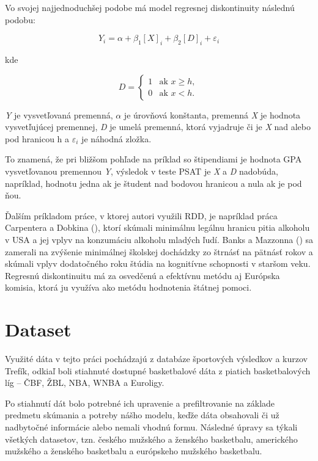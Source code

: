 \documentclass[
  digital, %
  oneside, %
  notable,   %
  lof,     %
  lot,     %
]{fithesis3}
\begin{document}
		Vo svojej najjednoduchšej podobe má model regresnej diskontinuity následnú podobu:
		
		\begin{equation}
		Y_{i} = \alpha + \beta _{1} [\textit{X}]_{i} + \beta _{2} [\textit{D}]_{i} + \varepsilon_{i}
		\end{equation}
		
		kde 
		
		 \begin{equation}
		D = \begin{cases}
		1 & \text{ak }x\geq{h}, \\
		0 & \text{ak }x < {h}.
		\end{cases}
		\end{equation}
		
		\textit{Y} je vysvetľovaná premenná, $\alpha$ je úrovňová konštanta, premenná \textit{X} je hodnota vysvetľujúcej premennej, \textit{D} je umelá premenná, ktorá vyjadruje či je \textit{X} nad alebo pod hranicou h a $\varepsilon_{i}$ je náhodná zložka. 
		
		To znamená, že pri bližšom pohľade na príklad so štipendiami je hodnota GPA vysvetľovanou premennou \textit{Y}, výsledok v teste PSAT je \textit{X} a \textit{D} nadobúda, napríklad, hodnotu jedna ak je študent nad bodovou hranicou a nula ak je pod ňou.
	
		Ďalším príkladom práce, v ktorej autori využili RDD, je napríklad práca Carpentera a Dobkina (\citeyear{carpenter2011}), ktorí skúmali minimálnu legálnu hranicu pitia alkoholu v USA a jej vplyv na konzumáciu alkoholu mladých ľudí. Banks a Mazzonna (\citeyear{banks2012}) sa zamerali na zvýšenie minimálnej školskej dochádzky zo štrnásť na pätnásť rokov a skúmali vplyv dodatočného roku štúdia na kognitívne schopnosti v staršom veku. Regresnú diskontinuitu má za osvedčenú a efektívnu metódu aj Európska komisia, ktorá ju využíva ako metódu hodnotenia štátnej pomoci. \parencite[s.~20]{ek2014} 
		
		\section{Dataset}
		Využité dáta v tejto práci pochádzajú z databáze športových výsledkov a kurzov Trefík, odkiaľ boli stiahnuté dostupné basketbalové dáta z piatich basketbalových líg – ČBF, ŽBL, NBA, WNBA a Euroligy. \parencite{trefik}
		
		Po stiahnutí dát bolo potrebné ich upravenie a prefiltrovanie na základe predmetu skúmania a potreby nášho modelu, keďže dáta obsahovali či už nadbytočné informácie alebo nemali vhodnú formu. Následné úpravy sa týkali všetkých datasetov, tzn. českého mužského a ženského basketbalu, amerického mužského a ženského basketbalu a európskeho mužského basketbalu.
		
\end{document}
